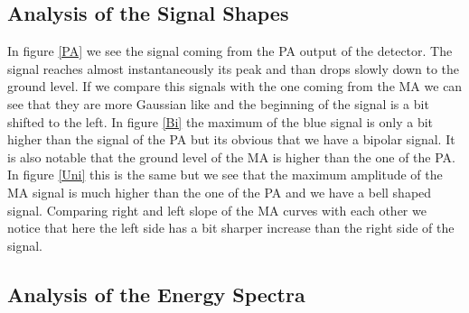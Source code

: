 \documentclass[30pt,a4paper]{article}
\begin{document}
 	\subsection{Analysis of the Signal Shapes}
 	In figure \ref{PA} we see the signal coming from the PA output of the detector. The signal reaches almost instantaneously its peak and than drops slowly down to the ground level. If we compare this signals with the one coming from the MA we can see that they are more Gaussian like and the beginning of the signal is a bit shifted to the left. In figure \ref{Bi} the maximum of the blue signal is only a bit higher than the signal of the PA but its obvious that we have a bipolar signal. It is also notable that the ground level of the MA is higher than the one of the PA. In figure \ref{Uni} this is the same but we see that the maximum amplitude of the MA signal is much higher than the one of the PA and we have a bell shaped signal. Comparing right and left slope of the MA curves with each other we notice that here the left side has a bit sharper increase than the right side of the signal.
 	\subsection{Analysis of the Energy Spectra}
\end{document}
